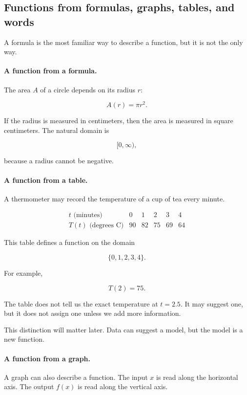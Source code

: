 \subsection{Functions from formulas, graphs, tables, and words}
\label{subsec:functions-from-formulas-graphs-tables-words}

A formula is the most familiar way to describe a function, but it is not the only way.

\paragraph{A function from a formula.}
The area \(A\) of a circle depends on its radius \(r\):

\[
A(r)=\pi r^2.
\]

If the radius is measured in centimeters, then the area is measured in square centimeters. The natural domain is

\[
[0,\infty),
\]

because a radius cannot be negative.

\paragraph{A function from a table.}
A thermometer may record the temperature of a cup of tea every minute.

\[
\begin{array}{c|ccccc}
t\text{ (minutes)} & 0 & 1 & 2 & 3 & 4 \\ \hline
T(t)\text{ (degrees C)} & 90 & 82 & 75 & 69 & 64
\end{array}
\]

This table defines a function on the domain

\[
\{0,1,2,3,4\}.
\]

For example,

\[
T(2)=75.
\]

The table does not tell us the exact temperature at \(t=2.5\). It may suggest one, but it does not assign one unless we add more information.

This distinction will matter later. Data can suggest a model, but the model is a new function.

\paragraph{A function from a graph.}
A graph can also describe a function. The input \(x\) is read along the horizontal axis. The output \(f(x)\) is read along the vertical axis.

